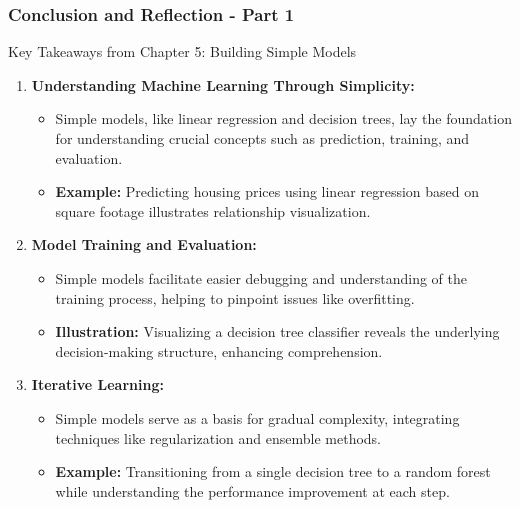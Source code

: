 \documentclass[aspectratio=169]{beamer}
\begin{document}
\begin{frame}[fragile]
    \frametitle{Conclusion and Reflection - Part 1}
    \begin{block}{Key Takeaways from Chapter 5: Building Simple Models}
        \begin{enumerate}
            \item \textbf{Understanding Machine Learning Through Simplicity:}
                \begin{itemize}
                    \item Simple models, like linear regression and decision trees, lay the foundation for understanding crucial concepts such as prediction, training, and evaluation.
                    \item \textbf{Example:} Predicting housing prices using linear regression based on square footage illustrates relationship visualization.
                \end{itemize}
                
            \item \textbf{Model Training and Evaluation:}
                \begin{itemize}
                    \item Simple models facilitate easier debugging and understanding of the training process, helping to pinpoint issues like overfitting.
                    \item \textbf{Illustration:} Visualizing a decision tree classifier reveals the underlying decision-making structure, enhancing comprehension.
                \end{itemize}
                
            \item \textbf{Iterative Learning:}
                \begin{itemize}
                    \item Simple models serve as a basis for gradual complexity, integrating techniques like regularization and ensemble methods.
                    \item \textbf{Example:} Transitioning from a single decision tree to a random forest while understanding the performance improvement at each step.
                \end{itemize}
        \end{enumerate}
    \end{block}
\end{frame}
\end{document}
